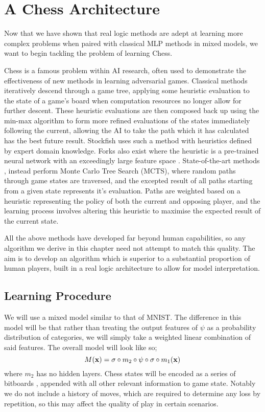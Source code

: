\chapter{A Chess Architecture}

Now that we have shown that real logic methods are adept at learning more complex problems when paired with classical MLP methods in mixed models, we want to begin tackling the problem of learning Chess. 

Chess is a famous problem within AI research, often used to demonstrate the effectiveness of new methods in learning adversarial games. Classical methods iteratively descend through a game tree, applying some heuristic evaluation to the state of a game's board when computation resources no longer allow for further descent. These heuristic evaluations are then composed back up using the min-max algorithm to form more refined evaluations of the states immediately following the current, allowing the AI to take the path which it has calculated has the best future result. Stockfish \cite{stockfish} uses such a method with heuristics defined by expert domain knowledge. Forks also exist where the heuristic is a pre-trained neural network with an exceedingly large feature space \cite{nnue}. State-of-the-art methods \cite{alphazero}, \cite{leela} instead perform Monte Carlo Tree Search (MCTS), where random paths through game states are traversed, and the excepted result of all paths starting from a given state represents it's evaluation. Paths are weighted based on a heuristic representing the policy of both the current and opposing player, and the learning process involves altering this heuristic to maximise the expected result of the current state. 

All the above methods have developed far beyond human capabilities, so any algorithm we derive in this chapter need not attempt to match this quality. The aim is to develop an algorithm which is superior to a substantial proportion of human players, built in a real logic architecture to allow for model interpretation. 

\section{Learning Procedure}

We will use a mixed model similar to that of MNIST. The difference in this model will be that rather than treating the output features of $\psi$ as a probability distribution of categories, we will simply take a weighted linear combination of said features. The overall model will look like so;
$$M(\mathbf{x}) = \sigma \circ m_2 \circ \psi \circ \sigma \circ m_1(\mathbf{x})$$
where $m_2$ has no hidden layers. Chess states will be encoded as a series of bitboards \cite{bitboard}, appended with all other relevant information to game state. Notably we do not include a history of moves, which are required to determine any loss by repetition, so this may affect the quality of play in certain scenarios.

